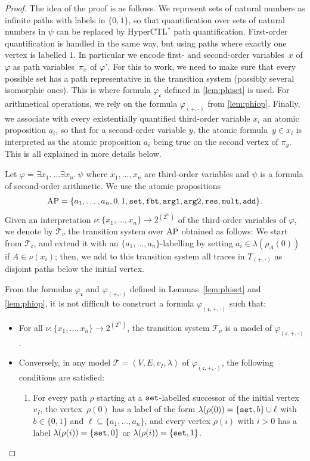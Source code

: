 \documentclass[dvipsnames,10pt,a4paper]{amsart}
\theoremstyle{definition}
\theoremstyle{remark}
\newcommand{\nats}{\mathbb{N}}
\newcommand\Nat{\nats}
\newcommand{\cont}{\mathfrak{c}}
\newcommand{\tsys}{\mathcal{T}}
\newcommand{\initmark}{I}
\newcommand{\hyctlstar}{{HyperCTL$^*$}\xspace}
\newcommand\AP{\textup{AP}}
\newcommand\argl{\textup{\texttt{arg1}}}
\newcommand\argr{\textup{\texttt{arg2}}}
\newcommand\res{\textup{\texttt{res}}}
\newcommand\add{\textup{\texttt{add}}}
\newcommand\mult{\textup{\texttt{mult}}}
\newcommand\fbt{\textup{\texttt{fbt}}}
\newcommand\pset{\textup{\texttt{set}}}
\newcommand\phiop{\varphi_{({+},{\cdot})}}
\newcommand\Top{T_{({+},{\cdot})}}
\newcommand\phiset{\varphi_{\cont}}
\newcommand\Kset{\tsys_{\cont}}
\newcommand\ys{y}
\newcommand\xt{x}
\newcommand\ai[1]{a_{#1}}
\newcommand\pix[1]{\pi_{#1}}
\newcommand\phiz{\varphi_{(\cont,{+},{\cdot})}}
\newcommand\inter{\nu}
\newcommand\tsysI{\tsys_{\inter}}
\begin{document}
\begin{proof}  
  The idea of the proof is as follows. We represent sets of natural numbers
  as infinite paths with labels in $\{0,1\}$, so that quantification over
  sets of natural numbers in $\psi$ can be replaced by \hyctlstar path
  quantification.
    First-order quantification is handled in the same way, but using
  paths where exactly one vertex is labelled $1$.
In particular we encode first- and second-order variables~$x$ of $\varphi$ as path variables~$\pix{x}$ of $\varphi'$.
  For this to work, we need to make sure that every possible set
  has a path representative in the transition system (possibly several
  isomorphic ones).
  This is where formula $\phiset$ defined in \autoref{lem:phiset} is used.
  For arithmetical operations, we rely on the formula $\phiop$ from
  \autoref{lem:phiop}.
  Finally, we associate with every existentially quantified third-order
  variable $\xt_i$ an atomic proposition $\ai i$, so that
  for a second-order variable $\ys$, the atomic formula~$\ys \in \xt_i$ is interpreted as the
  atomic proposition $\ai i$ being true on the second vertex of $\pix y$.
  This is all explained in more details below.
  \smallskip
  
  Let $\varphi = \exists \xt_1.\ \ldots \exists \xt_n.\ \psi$ where
  $\xt_1, \ldots, \xt_n$ are third-order variables
  and $\psi$ is a formula of second-order arithmetic. 
  We use the atomic propositions 
  \[\AP = \{a_1,\ldots,a_n,0,1,\pset,\fbt,\argl,\argr,\res,\mult,\add\}.\]
  Given an interpretation
  $\inter : \{\xt_1,\ldots,\xt_n\} \rightarrow 2^{(2^\Nat)}$
  of the third-order variables of $\varphi$, we denote by $\tsysI$ the
  transition system over $\AP$ obtained as follows:
  We start from $\Kset$, and extend it with an $\{a_1,\ldots,a_n\}$-labelling
  by setting $\ai i \in \lambda(\rho_A(0))$ if $A \in \inter(\xt_i)$;
  then, we add to this transition system all traces in $\Top$ as disjoint
  paths below the initial vertex.
  
  
  From the formulas $\phiset$ and $\phiop$ defined in Lemmas~\ref{lem:phiset}
  and \ref{lem:phiop}, it is not difficult to construct a formula
  $\phiz$ such that:
  \begin{itemize}
  \item For all $\inter : \{\xt_1,\ldots,\xt_n\} \rightarrow 2^{(2^\Nat)}$,
    the transition system $\tsysI$ is a model of $\phiz$.
  \item Conversely, in any model $\tsys = (V,E,v_\initmark, \lambda)$ of $\phiz$, the following conditions
    are satisfied:
  \begin{enumerate}
    \item
      For every path $\rho$ starting at a $\pset$-labelled successor of
      the initial vertex $v_\initmark$, the vertex~$\rho(0)$ has a label of the form $\lambda(\rho(0)) = \{\pset,b\} \cup \ell$
      with $b \in \{0,1\}$ and $\ell \subseteq \{\ai 1, \ldots, \ai n\}$,
      and every vertex $\rho(i)$ with $i > 0$ has a label
      $\lambda(\rho(i)) = \{\pset,0\}$ or $\lambda(\rho(i)) = \{\pset,1\}$.
      

\end{enumerate}
\end{itemize}
\end{proof}
\end{document}
